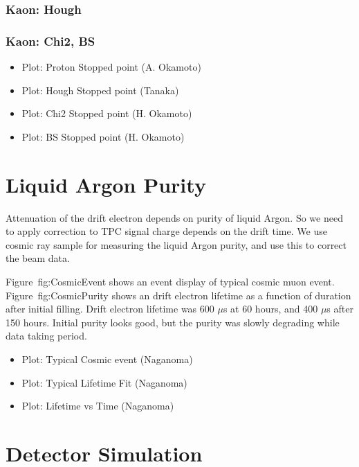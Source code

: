 \documentclass{cernyrep}
\begin{document}
\subsubsection{Kaon: Hough}
\subsubsection{Kaon: Chi2, BS}
\begin{itemize}
\item Plot: Proton Stopped point (A. Okamoto)
\item Plot: Hough Stopped point (Tanaka)
\item Plot: Chi2  Stopped point (H. Okamoto)
\item Plot: BS Stopped point (H. Okamoto)
\end{itemize}

\section{Liquid Argon Purity}


Attenuation of the drift electron depends on purity of liquid Argon.
So we need to apply correction to TPC signal charge depends on the drift time.
We use cosmic ray sample for measuring the liquid Argon purity,
and use this to correct the beam data.

Figure~{fig:CosmicEvent} shows an event display of typical cosmic muon event.
Figure~{fig:CosmicPurity} shows an drift electron lifetime as a function of
duration after initial filling.
Drift electron lifetime was 600 $\mu$s at 60 hours, and 400 $\mu$s after 150 hours.
Initial purity looks good, but the purity was slowly degrading
while data taking period.



\begin{itemize}
\item Plot: Typical Cosmic event (Naganoma)
\item Plot: Typical Lifetime Fit  (Naganoma)
\item Plot: Lifetime vs Time  (Naganoma)
\end{itemize}

\section{Detector Simulation}
\end{document}
